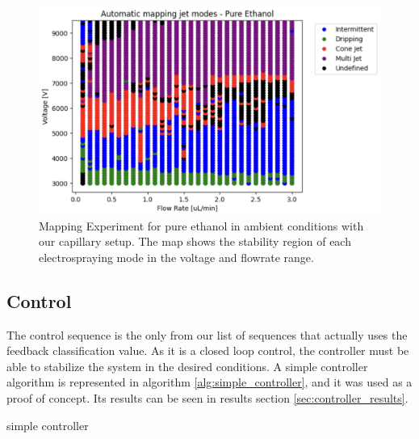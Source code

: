     \begin{figure}[H]
        \center
        \includegraphics[width=15cm]{Figuras/report4/map-2023-03-02.png}
        \caption{Mapping Experiment for pure ethanol in ambient conditions with our capillary setup. The map shows the stability region of each electrospraying mode in the voltage and flowrate range.}
        \label{fig:map3Data_fig}
    \end{figure}



\subsection{Control}

    The control sequence is the only from our list of sequences that actually uses the feedback classification value. 
    As it is a closed loop control, the controller must be able to stabilize the system in the desired conditions.
    A simple controller algorithm is represented in algorithm \ref{alg:simple_controller}, and it was used as a proof of concept.
    Its results can be seen in results section \ref{sec:controller_results}.

    \begin{algorithm}
        \caption{simple controller}\label{alg:simple_controller}
        \begin{algorithmic}
            
                \State {}
                \State {}
            \EndIf

        \EndFunction
        \end{algorithmic}
    \end{algorithm}



